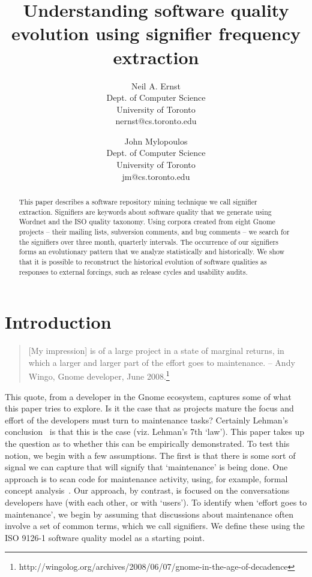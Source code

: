 \documentclass[conference, compsoc]{IEEEtran}
\begin{document}

 
\title{Understanding software quality evolution using signifier frequency extraction}
\author{
Neil A. Ernst\\Dept. of Computer Science\\University of Toronto\\nernst@cs.toronto.edu \and
John Mylopoulos\\Dept. of Computer Science\\University of Toronto\\jm@cs.toronto.edu }

\maketitle

\begin{abstract}
This paper describes a software repository mining technique we call signifier extraction. Signifiers are keywords about software quality that we generate using Wordnet and the ISO quality taxonomy. Using corpora created from eight Gnome projects -- their mailing lists, subversion comments, and bug comments -- we search for the signifiers over three month, quarterly intervals. The occurrence of our signifiers forms an evolutionary pattern that we analyze statistically and historically. We show that it is possible to reconstruct the historical evolution of software qualities as responses to external forcings, such as release cycles and usability audits. %
\end{abstract}

\section{Introduction}\label{sect:introduction}%
\begin{quote}[My impression] is of a large project in a state of marginal returns, in which a larger and larger part of the effort goes to maintenance. -- Andy Wingo, Gnome developer, June 2008.\footnote{http://wingolog.org/archives/2008/06/07/gnome-in-the-age-of-decadence}\end{quote}
	This quote, from a developer in the Gnome ecosystem, captures some of what this paper tries to explore. Is it the case that as projects mature the focus and effort of the developers must turn to maintenance tasks\cite{Swanson1976}? Certainly Lehman's conclusion~\cite{lehman_software_2006} is that this is the case (viz. Lehman's 7th `law'). This paper takes up the question as to whether this can be empirically demonstrated. To test this notion, we begin with a few assumptions. The first is that there is some sort of signal we can capture that will signify that `maintenance' is being done. One approach is to scan code for maintenance activity, using, for example, formal concept analysis~\cite{breu06msr}. Our approach, by contrast, is focused on the conversations developers have (with each other, or with `users'). To identify when `effort goes to maintenance', we begin by assuming that discussions about maintenance often involve a set of common terms, which we call signifiers. We define these using the ISO 9126-1 software quality model \cite{iso9126} as a starting point. 
	
\end{document}
